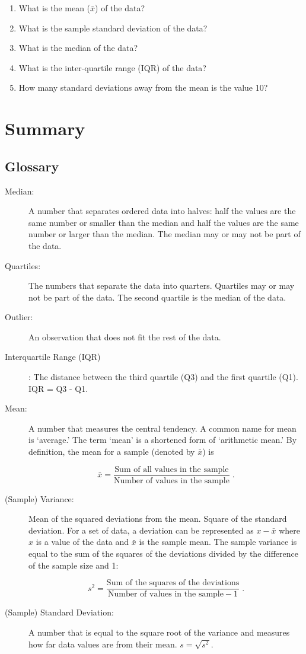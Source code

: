 \documentclass[
]{krantz}
\theoremstyle{definition}
\theoremstyle{definition}
\theoremstyle{definition}
\theoremstyle{remark}
\begin{document}
\begin{enumerate}
\def\labelenumi{\arabic{enumi}.}
\item
  What is the mean (\(\bar x\)) of the data?
\item
  What is the sample standard deviation of the data?
\item
  What is the median of the data?
\item
  What is the inter-quartile range (IQR) of the data?
\item
  How many standard deviations away from the mean is the value 10?
\end{enumerate}

\hypertarget{summary-2}{%
\section{Summary}\label{summary-2}}

\hypertarget{glossary}{%
\subsection*{Glossary}\label{glossary}}


\begin{description}
\item[Median:]
A number that separates ordered data into halves: half the values
are the same number or smaller than the median and half the values
are the same number or larger than the median. The median may or may
not be part of the data.
\item[Quartiles:]
The numbers that separate the data into quarters. Quartiles may or
may not be part of the data. The second quartile is the median of
the data.
\item[Outlier:]
An observation that does not fit the rest of the data.
\item[Interquartile Range (IQR)]
: The distance between the third quartile (Q3) and the first
quartile (Q1). IQR = Q3 - Q1.
\item[Mean:]
A number that measures the central tendency. A common name for mean
is `average.' The term `mean' is a shortened form of `arithmetic
mean.' By definition, the mean for a sample (denoted by \(\bar x\)) is

\[\bar x = \frac{\mbox{Sum of all values in the sample}}{\mbox{Number of values in the sample}}\;.\]
\item[(Sample) Variance:]
Mean of the squared deviations from the mean. Square of the standard
deviation. For a set of data, a deviation can be represented as
\(x - \bar x\) where \(x\) is a value of the data and \(\bar x\) is the
sample mean. The sample variance is equal to the sum of the squares
of the deviations divided by the difference of the sample size and
1:

\[s^2 = \frac{\mbox{Sum of the squares of the deviations}}{\mbox{Number of values in the sample}-1}\;.\]
\item[(Sample) Standard Deviation:]
A number that is equal to the square root of the variance and
measures how far data values are from their mean. \(s = \sqrt{s^2}\).
\end{description}
\end{document}
